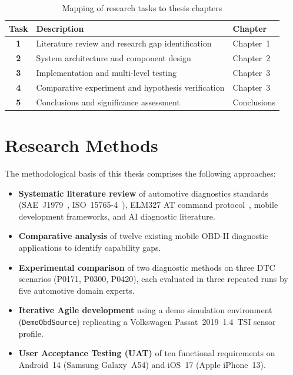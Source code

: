 \begin{table}[!htbp]
\centering
\caption{Mapping of research tasks to thesis chapters}
\label{tab:tasks}
\begin{tabularx}{0.95\linewidth}{>{\bfseries}c p{9cm} X}
\toprule
\rowcolor{tblhdr}
\color{white}\textbf{Task} &
\color{white}\textbf{Description} &
\color{white}\textbf{Chapter} \\
\midrule
1 & Literature review and research gap identification & Chapter~1 \\
2 & System architecture and component design         & Chapter~2 \\
3 & Implementation and multi-level testing           & Chapter~3 \\
4 & Comparative experiment and hypothesis verification& Chapter~3 \\
5 & Conclusions and significance assessment          & Conclusions \\
\bottomrule
\end{tabularx}
\end{table}

\section*{Research Methods}

The methodological basis of this thesis comprises the following approaches:

\begin{itemize}
  \item \textbf{Systematic literature review} of automotive diagnostics standards
        (SAE~J1979~\cite{sae2020}, ISO~15765-4~\cite{iso2021}), ELM327 AT command
        protocol~\cite{elm2019}, mobile development frameworks, and AI diagnostic
        literature.
  \item \textbf{Comparative analysis} of twelve existing mobile OBD-II diagnostic
        applications to identify capability gaps.
  \item \textbf{Experimental comparison} of two diagnostic methods on three DTC
        scenarios (P0171, P0300, P0420), each evaluated in three repeated runs by five
        automotive domain experts.
  \item \textbf{Iterative Agile development} using a demo simulation environment
        (\texttt{DemoObdSource}) replicating a Volkswagen Passat~2019~1.4~TSI sensor
        profile.
  \item \textbf{User Acceptance Testing (UAT)} of ten functional requirements on
        Android~14 (Samsung Galaxy~A54) and iOS~17 (Apple iPhone~13).
\end{itemize}

